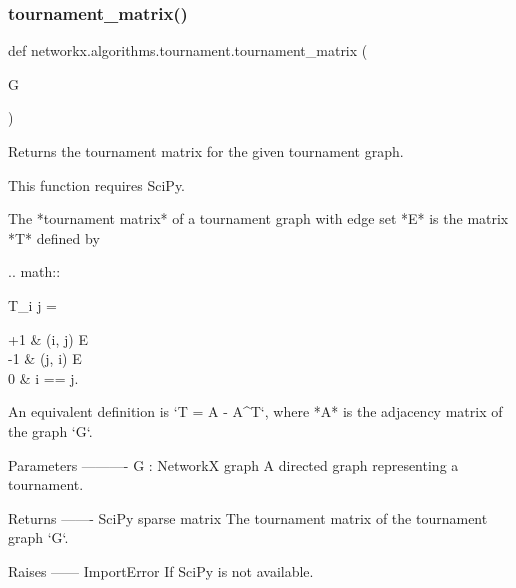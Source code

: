  \mbox{\label{namespacenetworkx_1_1algorithms_1_1tournament_a70eda0ba7f3f278d7c976752855d0c3c}} 
\subsubsection{\texorpdfstring{tournament\+\_\+matrix()}{tournament\_matrix()}}
{\footnotesize\ttfamily def networkx.\+algorithms.\+tournament.\+tournament\+\_\+matrix (\begin{DoxyParamCaption}\item[{}]{G }\end{DoxyParamCaption})}

\begin{DoxyVerb}Returns the tournament matrix for the given tournament graph.

This function requires SciPy.

The *tournament matrix* of a tournament graph with edge set *E* is
the matrix *T* defined by

.. math::

   T_{i j} =
   \begin{cases}
   +1 &  (i, j) \in E \\
   -1 &  (j, i) \in E \\
   0 &  i == j.
   \end{cases}

An equivalent definition is `T = A - A^T`, where *A* is the
adjacency matrix of the graph `G`.

Parameters
----------
G : NetworkX graph
    A directed graph representing a tournament.

Returns
-------
SciPy sparse matrix
    The tournament matrix of the tournament graph `G`.

Raises
------
ImportError
    If SciPy is not available.\end{DoxyVerb}
 